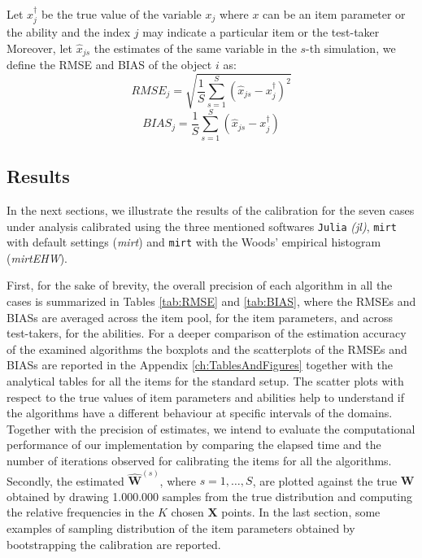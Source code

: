 \begin{enumerate}
	Let $x_j^\dagger$ be the true value of the variable $x_j$ where $x$ can be an item parameter or the ability and the index $j$ may indicate a particular item or the test-taker Moreover, let $\hat{x}_{js}$ the estimates of the same variable in the $s$-th simulation, we define the RMSE and BIAS of the object $i$ as:
	\begin{equation}
	RMSE_j=\sqrt{\frac{1}{S} \sum_{s=1}^S{\left( \hat{x}_{js}-x_j^\dagger \right)^2}}
	\end{equation}
	\begin{equation}
	BIAS_j=\frac{1}{S} \sum_{s=1}^S{\left( \hat{x}_{js}-x_j^\dagger \right)}
	\end{equation}
\end{enumerate}

\subsection{Results} 

In the next sections, we illustrate the results of the calibration for the seven cases under analysis calibrated using the three mentioned softwares \texttt{Julia} \emph{(jl)}, \texttt{mirt} with default settings (\emph{mirt}) and \texttt{mirt} with the Woods' empirical histogram (\emph{mirt\tiny{EHW}}).

First, for the sake of brevity, the overall precision of each algorithm in all the cases is summarized in Tables \ref{tab:RMSE} and \ref{tab:BIAS}, where the RMSEs and BIASs are averaged across the item pool, for the item parameters, and across test-takers, for the abilities. For a deeper comparison of the estimation accuracy of the examined algorithms the boxplots and the scatterplots of the RMSEs and BIASs are reported in the Appendix \ref{ch:TablesAndFigures} together with the analytical tables for all the items for the standard setup. The scatter plots with respect to the true values of item parameters and abilities help to understand if the algorithms have a different behaviour at specific intervals of the domains.
Together with the precision of estimates, we intend to evaluate the computational performance of our implementation by comparing the elapsed time and the number of iterations observed for calibrating the items for all the algorithms.
Secondly, the estimated $\mathbf{\hat{W}}^{(s)}$, where $s=1,\ldots,S$, are plotted against the true $\mathbf{W}$ obtained by drawing 1.000.000 samples from the true distribution and computing the relative frequencies in the $K$ chosen $\mathbf{X}$ points.
In the last section, some examples of sampling distribution of the item parameters obtained by bootstrapping the calibration are reported. 

